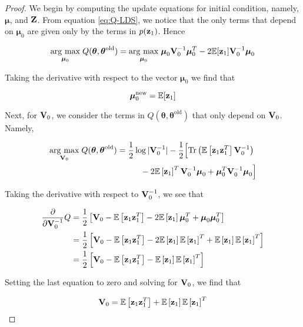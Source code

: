 \documentclass[11pt]{article}
\numberwithin{equation}{section}
\newcommand{\argmax}[1]{\underset{#1}{\operatorname{arg}\,\operatorname{max}}\;}
\newcommand{\expectation}[1]{\mathbb{E}\left[#1\right]}
\newcommand{\z}{{\bf z}}
\begin{document}
\begin{proof}
	We begin by computing the update equations for initial condition, namely, $\boldsymbol\mu$, and $\bf Z$. From equation \ref{eq:Q-LDS}, we notice that the only terms that depend on $\boldsymbol{\mu}_0$ are given only by the terms in $p(\z_1)$. Hence

\begin{align}
	\argmax{\boldsymbol{\mu}_0} Q(\boldsymbol\theta, \boldsymbol\theta^\text{old}) = \argmax{\boldsymbol{\mu}_0} \boldsymbol{\mu}_0 {\bf V}_0^{-1}\boldsymbol{\mu}_0^T -2\mathbb{E}[{\z_1}]{\bf V}_0^{-1}\boldsymbol{\mu}_0 \nonumber
\end{align}

Taking the derivative with respect to the vector $\boldsymbol{\mu}_0$ we find that

\begin{equation}
	\boldsymbol{\mu}_0^\text{new} = \mathbb{E}[{\z_1}]
\end{equation}

Next, for ${\bf V}_0$, we consider the terms in $Q(\boldsymbol\theta, \boldsymbol\theta^\text{old})$ that only depend on ${\bf V}_0$. Namely,

\begin{align}
	\argmax{{\bf V}_0} Q(\boldsymbol\theta, \boldsymbol\theta^\text{old}) &= \frac{1}{2}\log \vert
	  {\bf V}_0^{-1}\vert -\frac{1}{2}\Big[\text{Tr}\left(\mathbb{E}\left[\z_1 \z_1^T\right] {\bf V}_0^{-1}\right) \nonumber\\
	  &\hspace{1cm} -2 \mathbb{E}\left[\z_1\right]^T{\bf V}_0^{-1}\boldsymbol\mu_0 + \boldsymbol\mu_0^T {\bf V}_0^{-1}\boldsymbol\mu_0\Big] \nonumber
\end{align}

Taking the derivative with respect to ${\bf V}_0^{-1}$, we see that

\begin{align}
	\frac{\partial}{\partial {\bf V}_0^{-1}} Q &= \frac{1}{2}\left[{\bf V}_0 - \expectation{\z_1 \z_1^T} - 2\expectation{\z_1}\boldsymbol{\mu}_0^T + \boldsymbol{\mu}_0 \boldsymbol{\mu}_0^T \right] \nonumber \\
	&= \frac{1}{2} \left[{\bf V}_0 - \expectation{\z_1 \z_1^T} - 2\expectation{\z_1}\expectation{\z_1}^T + \expectation{\z_1}\expectation{\z_1}^T \right] \nonumber \\
	&= \frac{1}{2}\left[{\bf V}_0 - \expectation{\z_1 \z_1^T} - \expectation{\z_1}\expectation{\z_1}^T\right]
\end{align}

Setting the last equation to zero and solving for ${\bf V}_0$, we find that

\begin{equation}
	{\bf V}_0 = \expectation{\z_1 \z_1^T} + \expectation{\z_1}\expectation{\z_1}^T
\end{equation}
\end{proof}
\end{document}
